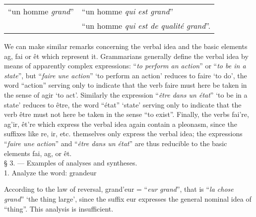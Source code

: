 {    \begin{center}
      \begin{tabular}[t]{r@{ = }l}
        ``un homme \emph{grand}'' & ``un homme \emph{qui est grand}''\\
                                & ``un homme \emph{qui est de qualité grand}''.
      \end{tabular}
    \end{center}
    
    We can make similar remarks concerning the verbal idea and the
    basic elements \textup{ag}, \textup{fai} or \textup{êt} which
    represent it.  Grammarians generally define the verbal idea by
    means of apparently complex expressions: ``\emph{to perform an
      action}'' or ``\emph{to be in a state}'', but ``\emph{faire une
      action}'' `to perform an action' reduces to \textup{faire} `to
    do', the word ``action'' serving only to indicate that the verb
    \textup{faire} must here be taken in the sense of \textup{agir}
    `to act'. Similarly the expression ``\emph{être dans un état}''
    `to be in a state' reduces to \textup{être}, the word ``état''
    `state' serving only to indicate that the verb \textup{être}
    must not here be taken in the sense ``to exist''. Finally, the
    verbs \textup{fai're}, \textup{ag'ir}, \textup{êt're} which
    express the verbal idea again contain a pleonasm, since the
    suffixes like \textup{re}, \textup{ir}, etc. themselves only
    express the verbal idea; the expressions ``\emph{faire une
      action}'' and ``\emph{être dans un état}'' are thus reducible to
    the basic elements \textup{fai}, \textup{ag}, or \textup{êt}.\\[1ex]

    {\large § 3. — \textsf{Examples of analyses and syntheses.}}\\

    1. Analyze the word: \textup{grandeur}

    According to the law of reversal, \textup{grand'eur} = ``\emph{eur
    grand}'', that is ``\emph{la chose grand}'' `the thing large', since
  the suffix \textup{eur} expresses the general nominal idea of
  ``thing''. This analysis is insufficient.}

